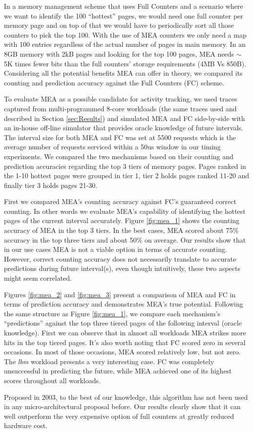 In a memory management scheme that uses Full Counters and a scenario where we want to identify the 100 ``hottest'' pages, we would need one full counter per memory page and on top of that we would have to periodically sort all those counters to pick the top 100. With the use of MEA counters we only need a map with 100 entries regardless of the actual number of pages in main memory. In an 8GB memory with 2kB pages and looking for the top 100 pages, MEA needs $\sim$5K times fewer bits than the full counters' storage requirements (4MB Vs 850B). Considering all the potential benefits MEA can offer in theory, we compared its counting and prediction accuracy against the Full Counters (FC) scheme. 

To evaluate MEA as a possible candidate for activity tracking, we used traces captured from multi-programmed 8-core workloads (the same traces used and described in Section \ref{sec:Results}) and simulated MEA and FC side-by-side with an in-house off-line simulator that provides oracle knowledge of future intervals. The interval size for both MEA and FC was set at 5500 requests which is the average number of requests serviced within a 50us window in our timing experiments. We compared the two mechanisms based on their counting and prediction accuracies regarding the top 3 tiers of memory pages. Pages ranked in the 1-10 hottest pages were grouped in tier 1, tier 2 holds pages ranked 11-20 and finally tier 3 holds pages 21-30.

First we compared MEA's counting accuracy against FC's guaranteed correct counting. In other words we evaluate MEA's capability of identifying the hottest pages of the current interval accurately. Figure \ref{fig:mea_1} shows the counting accuracy of MEA in the top 3 tiers. In the best cases, MEA scored about 75\% accuracy in the top three tiers and about 50\% on average. Our results show that in our use cases MEA is not a viable option in terms of accurate counting. However, correct counting accuracy does not necessarily translate to accurate predictions during future interval(s), even though intuitively, these two aspects might seem correlated.

Figures \ref{fig:mea_2} and \ref{fig:mea_3} present a comparison of MEA and FC in terms of prediction accuracy and demonstrates MEA's true potential. Following the same structure as Figure \ref{fig:mea_1}, we compare each mechanism's ``predictions'' against the top three tiered pages of the following interval (oracle knowledge). First we can observe that in almost all workloads MEA strikes more hits in the top tiered pages. It's also worth noting that FC scored zero in several occasions. In most of those occasions, MEA scored relatively low, but not zero. The \textit{lbm} workload presents a very interesting case. FC was completely unsuccessful in predicting the future, while MEA achieved one of its highest scores throughout all workloads.

Proposed in 2003, to the best of our knowledge, this algorithm has not been used in any micro-architectural proposal before. Our results clearly show that it can well outperform the very expensive option of full counters at greatly reduced hardware cost.
